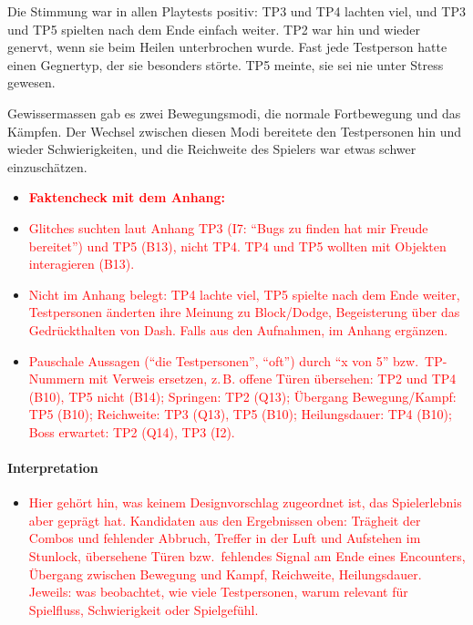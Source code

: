 \documentclass[../Main.tex]{subfiles}
\begin{document}
Die Stimmung war in allen Playtests positiv: TP3 und TP4 lachten viel, und TP3 und TP5 spielten nach dem Ende einfach weiter. TP2 war hin und wieder genervt, wenn sie beim Heilen unterbrochen wurde. Fast jede Testperson hatte einen Gegnertyp, der sie besonders störte. TP5 meinte, sie sei nie unter Stress gewesen.

Gewissermassen gab es zwei Bewegungsmodi, die normale Fortbewegung und das Kämpfen. Der Wechsel zwischen diesen Modi bereitete den Testpersonen hin und wieder Schwierigkeiten, und die Reichweite des Spielers war etwas schwer einzuschätzen.

\begin{itemize}[leftmargin=1.5cm]
    \item \textcolor{red}{\textbf{Faktencheck mit dem Anhang:}}
    \item \textcolor{red}{Glitches suchten laut Anhang TP3 (I7: \enquote{Bugs zu finden hat mir Freude bereitet}) und TP5 (B13), nicht TP4. TP4 und TP5 wollten mit Objekten interagieren (B13).}
    \item \textcolor{red}{Nicht im Anhang belegt: TP4 lachte viel, TP5 spielte nach dem Ende weiter, Testpersonen änderten ihre Meinung zu Block/Dodge, Begeisterung über das Gedrückthalten von Dash. Falls aus den Aufnahmen, im Anhang ergänzen.}
    \item \textcolor{red}{Pauschale Aussagen (\enquote{die Testpersonen}, \enquote{oft}) durch \enquote{x von 5} bzw.\ TP-Nummern mit Verweis ersetzen, z.\,B. offene Türen übersehen: TP2 und TP4 (B10), TP5 nicht (B14); Springen: TP2 (Q13); Übergang Bewegung/Kampf: TP5 (B10); Reichweite: TP3 (Q13), TP5 (B10); Heilungsdauer: TP4 (B10); Boss erwartet: TP2 (Q14), TP3 (I2).}
\end{itemize}

\paragraph{Interpretation}
\begin{itemize}[leftmargin=1.5cm]
    \item \textcolor{red}{Hier gehört hin, was keinem Designvorschlag zugeordnet ist, das Spielerlebnis aber geprägt hat. Kandidaten aus den Ergebnissen oben: Trägheit der Combos und fehlender Abbruch, Treffer in der Luft und Aufstehen im Stunlock, übersehene Türen bzw.\ fehlendes Signal am Ende eines Encounters, Übergang zwischen Bewegung und Kampf, Reichweite, Heilungsdauer. Jeweils: was beobachtet, wie viele Testpersonen, warum relevant für Spielfluss, Schwierigkeit oder Spielgefühl.}
\end{itemize}
\end{document}

